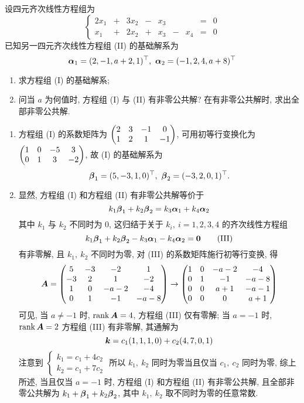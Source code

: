\begin{example}[2005 西安电子科技大学]
    设四元齐次线性方程组为
    \begin{equation*}
        \left\{\begin{matrix}
            2x_1 & + & 3x_2 & - & x_3 &   &     & = & 0 \\
            x_1  & + & 2x_2 & + & x_3 & - & x_4 & = & 0
        \end{matrix}\right.
        \tag{I}
    \end{equation*}
    已知另一四元齐次线性方程组 (II) 的基础解系为 $$\vb*{\alpha}_1=(2,-1,a+2,1)^\top,~\vb*{\alpha}_2=(-1,2,4,a+8)^\top$$
    \begin{enumerate}[label=(\arabic{*})]
        \item 求方程组 (I) 的基础解系;
        \item 问当 $a$ 为何值时, 方程组 (I) 与 (II) 有非零公共解? 在有非零公共解时, 求出全部非零公共解.
    \end{enumerate}
\end{example}
\begin{solution}
    \begin{enumerate}[label=(\arabic{*})]
        \item 方程组 (I) 的系数矩阵为 $\mqty(2&3&-1&0\\1&2&1&-1)$, 可用初等行变换化为 $\mqty(1&0&-5&3\\0&1&3&-2)$, 故 (I) 的基础解系为
              $$\vb*{\beta}_1=(5,-3,1,0)^\top,~\vb*{\beta}_2=(-3,2,0,1)^\top.$$
        \item 显然, 方程组 (I) 和方程组 (II) 有非零公共解等价于 $$k_1\vb*{\beta}_1+k_2\vb*{\beta}_2=k_3\vb*{\alpha}_1+k_4\vb*{\alpha}_2$$
              其中 $k_1$ 与 $k_2$ 不同时为 0, 这归结于关于 $k_i,~i=1,2,3,4$ 的齐次线性方程组
              \begin{equation*}
                  k_1\vb*{\beta}_1+k_2\vb*{\beta}_2-k_3\vb*{\alpha}_1-k_4\vb*{\alpha}_2=\vb*{0}
                  \tag{III}
              \end{equation*}
              有非零解, 且 $k_1,~k_2$ 不同时为零, 对 (III) 的系数矩阵施行初等行变换, 得
              $$\vb*{A}=\mqty(5&-3&-2&1\\-3&2&1&-2\\1&0&-a-2&-4\\0&1&-1&-a-8)\to\mqty(1&0&-a-2&-4\\0&1&-1&-a-8\\0&0&a+1&-a-1\\0&0&0&a+1)$$
              可见, 当 $a\neq-1$ 时, $\rank\vb*{A}=4$, 方程组 (III) 仅有零解; 当 $a=-1$ 时, $\rank\vb*{A}=2$ 方程组 (III) 有非零解, 其通解为
              $$\vb*{k}=c_1(1,1,1,0)+c_2(4,7,0,1)$$
              注意到 $\begin{cases}
                      k_1=c_1+4c_2 \\k_2=c_1+7c_2
                  \end{cases}$ 所以 $k_1,~k_2$ 同时为零当且仅当 $c_1,~c_2$ 同时为零, 
              综上所述, 当且仅当 $a=-1$ 时, 方程组 (I) 和方程组 (II) 有非零公共解, 且全部非零公共解为 $k_1+\vb*{\beta}_1+k_2\vb*{\beta}_2$, 
              其中 $k_1,~k_2$ 取不同时为零的任意常数.
    \end{enumerate}
\end{solution}
